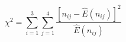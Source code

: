 

\[
\chi^2 = \sum_{i=1}^{3}{\sum_{j=1}^{4}{\frac{[n_{ij} - \hat{E}(n_{ij})]^2}{\hat{E}(n_{ij})}}}
\]


